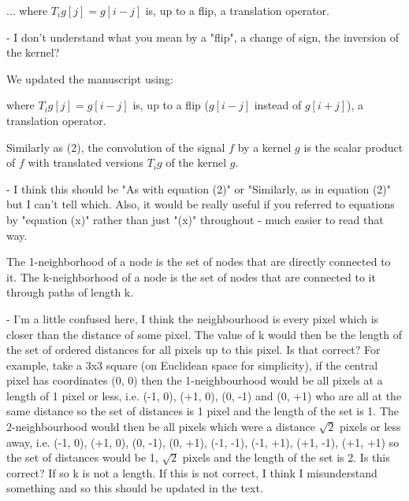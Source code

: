\documentclass[12pt,a4paper]{article}
\newcommand{\nati}[1]{{\color[rgb]{.1,.6,.1}{NP: #1}}}
\newcommand{\todo}[1]{{\color[rgb]{.6,.1,.6}{TODO: #1}}}
\newcommand{\1}{\b{1}}              %
\newcommand{\0}{\b{0}}              %
\begin{document}
\begin{mdframed}[style=comment]
... where $T_ig[j]=g[i-j]$ is, up to a flip, a translation operator.

 - I don't understand what you mean by a "flip", a change of sign, the inversion of the kernel?
\end{mdframed}

We updated the manuscript using:
\begin{mdframed}[style=manuscript]
where $T_i g[j] = g[i-j]$ is, up to a flip ($g[i-j]$ instead of $g[i+j]$), a translation operator.
\end{mdframed}

\begin{mdframed}[style=comment]
Similarly as (2), the convolution of the signal $f$ by a kernel $g$ is the scalar product of $f$ with translated versions $T_ig$ of the kernel $g$.

- I think this should be "As with equation (2)" or "Similarly, as in equation (2)" but I can't tell which. Also, it would be really useful if you referred to equations by "equation (x)" rather than just "(x)" throughout - much easier to read that way.
\end{mdframed}
\todo{Assign: @michael, @tomek}
\nati{I do not know what we should do.}

\begin{mdframed}[style=comment]
The 1-neighborhood of a node is the set of nodes that are directly connected to it. The k-neighborhood of a node is the set of nodes that are connected to it through paths of length k.

- I'm a little confused here, I think the neighbourhood is every pixel which is closer than the distance of some pixel. The value of k would then be the length of the set of ordered distances for all pixels up to this pixel. Is that correct? For example, take a 3x3 square (on Euclidean space for simplicity), if the central pixel has coordinates (0, 0) then the 1-neighbourhood would be all pixels at a length of 1 pixel or less, i.e. (-1, 0), (+1, 0), (0, -1) and (0, +1) who are all at the same distance so the set of distances is {1} pixel and the length of the set is 1. The 2-neighbourhood would then be all pixels which were a distance $\sqrt{2}$ pixels or less away, i.e. (-1, 0), (+1, 0), (0, -1), (0, +1), (-1, -1), (-1, +1), (+1, -1), (+1, +1) so the set of distances would be {1, $\sqrt{2}$} pixels and the length of the set is 2. Is this correct? If so k is not a length. If this is not correct, I think I misunderstand something and so this should be updated in the text.
\end{mdframed}
\todo{Assigned: @michael}
\end{document}
